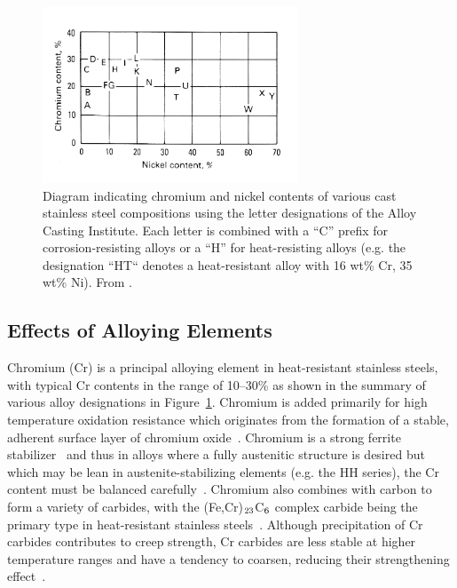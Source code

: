 \begin{figure}
\centering
\includegraphics[width=3in]{figures/aci-designation.png}
\caption[Diagram indicating chromium and nickel contents of various cast stainless steel compositions according to the letter designations of the Alloy Casting Institute.]{Diagram indicating chromium and nickel contents of various cast stainless steel compositions using the letter designations of the Alloy Casting Institute. Each letter is combined with a “C” prefix for corrosion-resisting alloys or a “H” for heat-resisting alloys (e.g. the designation “HT“ denotes a heat-resistant alloy with 16 wt\% Cr, 35 wt\% Ni). From \citet{blair_cast_stainless_1990}.}
\label{fig:aci-alloy-designations}
\end{figure}

\subsection{Effects of Alloying Elements}
Chromium (Cr) is a principal alloying element in heat-resistant stainless steels, with typical Cr contents in the range of \numrange[range-phrase=--]{10}{30}\% as shown in the summary of various alloy designations in Figure~\ref{fig:aci-alloy-designations}. Chromium is added primarily for high temperature oxidation resistance which originates from the formation of a stable, adherent surface layer of chromium oxide~\cite{kane_evolution_1991}. Chromium is a strong ferrite stabilizer~\cite{folkhard_welding_1988} and thus in alloys where a fully austenitic structure is desired but which may be lean in austenite-stabilizing elements (e.g. the HH series), the Cr content must be balanced carefully~\cite{avery_cast_1969}. Chromium also combines with carbon to form a variety of carbides, with the (Fe,Cr)$_\textnormal{23}$C$_\textnormal{6}$ complex carbide being the primary type in heat-resistant stainless steels~\cite{sourmail_precipitation_2001}. Although precipitation of Cr carbides contributes to creep strength, Cr carbides are less stable at higher temperature ranges and have a tendency to coarsen, reducing their strengthening effect~\cite{avery_cast_1969}.

